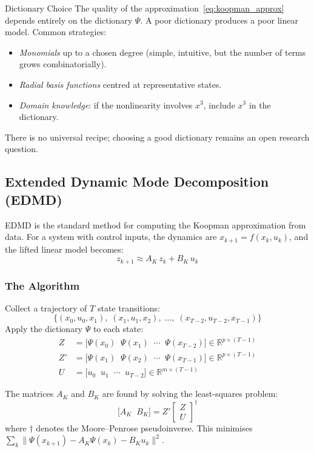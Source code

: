 \begin{alertbox}{Dictionary Choice}
	The quality of the approximation~\eqref{eq:koopman_approx} depends entirely on the dictionary $\Psi$. A poor dictionary produces a poor linear model. Common strategies:
	\begin{itemize}[noitemsep]
		\item \emph{Monomials} up to a chosen degree (simple, intuitive, but the number of terms grows combinatorially).
		\item \emph{Radial basis functions} centred at representative states.
		\item \emph{Domain knowledge}: if the nonlinearity involves $x^3$, include $x^3$ in the dictionary.
	\end{itemize}
	There is no universal recipe; choosing a good dictionary remains an open research question.
\end{alertbox}


\subsection{Extended Dynamic Mode Decomposition (EDMD)}
\label{sec:edmd}

EDMD is the standard method for computing the Koopman approximation from data. For a system with control inputs, the dynamics are $x_{k+1} = f(x_k, u_k)$, and the lifted linear model becomes:
\begin{equation*}
	z_{k+1} \approx A_K\,z_k + B_K\,u_k
\end{equation*}

\subsubsection*{The Algorithm}

Collect a trajectory of $T$ state transitions:
\[
\{(x_0, u_0, x_1),\; (x_1, u_1, x_2),\; \ldots,\; (x_{T-2}, u_{T-2}, x_{T-1})\}
\]
Apply the dictionary $\Psi$ to each state:
\begin{align*}
	Z &= \bigl[\Psi(x_0) \;\; \Psi(x_1) \;\; \cdots \;\; \Psi(x_{T-2})\bigr] \in \mathbb{R}^{p \times (T-1)} \\
	Z' &= \bigl[\Psi(x_1) \;\; \Psi(x_2) \;\; \cdots \;\; \Psi(x_{T-1})\bigr] \in \mathbb{R}^{p \times (T-1)} \\
	U &= \bigl[u_0 \;\; u_1 \;\; \cdots \;\; u_{T-2}\bigr] \in \mathbb{R}^{m \times (T-1)}
\end{align*}

The matrices $A_K$ and $B_K$ are found by solving the least-squares problem:
\begin{equation*}
	\bigl[A_K \;\; B_K\bigr] = Z' \begin{bmatrix} Z \\ U \end{bmatrix}^\dagger
\end{equation*}
where $\dagger$ denotes the Moore--Penrose pseudoinverse. This minimises $\sum_{k} \|\Psi(x_{k+1}) - A_K\Psi(x_k) - B_K u_k\|^2$.

